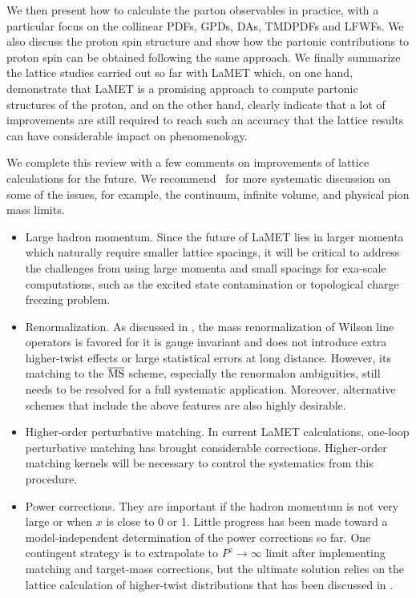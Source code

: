 We then present how to calculate the parton observables in practice, with a particular focus on the collinear PDFs, GPDs, DAs, TMDPDFs and LFWFs. We also discuss the proton spin structure and show how the partonic contributions to proton spin can be obtained following the same approach. We finally summarize the lattice studies carried out so far with LaMET which, on one hand, demonstrate that LaMET is a promising approach to compute partonic structures of the proton, and on the other hand, clearly indicate that a lot of improvements are still required to reach such an accuracy that the lattice results can have considerable impact on phenomenology.

We complete this review with a few comments on improvements of lattice calculations for the future.
%
We recommend~\cite{Alexandrou:2019lfo} for more systematic discussion on some of the issues, for example, the continuum, infinite volume, and physical pion mass limits.

\begin{itemize}
	
	\item Large hadron momentum. Since the future of LaMET lies in larger momenta which naturally require smaller lattice spacings, it will be critical to address the challenges from using large momenta and small spacings for exa-scale computations, such as the excited state contamination or topological charge freezing problem.
	
	\item Renormalization. As discussed in , the mass renormalization of Wilson line operators is favored for it is gauge invariant and does not introduce extra higher-twist effects or large statistical errors at long distance. However, its matching to the ${\overline{\rm MS}}$ scheme, especially the renormalon ambiguities, still needs to be resolved for a full systematic application. Moreover, alternative schemes that include the above features are also highly desirable.
	
	\item Higher-order perturbative matching. In current LaMET calculations, one-loop perturbative matching
	has brought considerable corrections. Higher-order matching kernels will be necessary to control the systematics from this procedure.
	
	\item Power corrections. They are important if the hadron momentum is not very large or when $x$ is close to 0 or 1.
	Little progress has been made toward a model-independent determination of the power corrections so far. One contingent strategy is to extrapolate to $P^z\to\infty$ limit after implementing matching and target-mass corrections, but the ultimate solution relies on the lattice calculation of higher-twist distributions that has been discussed in .
	
\end{itemize}

